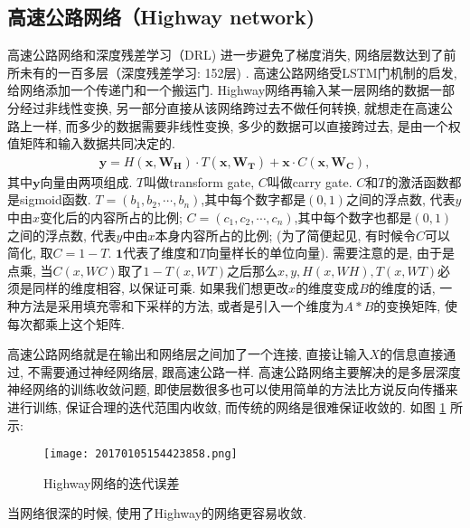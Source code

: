 \subsection{高速公路网络（Highway network) }
高速公路网络和深度残差学习（DRL) 进一步避免了梯度消失, 网络层数达到了前所未有的一百多层（深度残差学习: 152层) \cite{HeCVPR2016-9590, NIPS2015-5850}.
高速公路网络受LSTM门机制的启发, 给网络添加一个传递门和一个搬运门. Highway网络再输入某一层网络的数据一部分经过非线性变换, 另一部分直接从该网络跨过去不做任何转换, 就想走在高速公路上一样, 而多少的数据需要非线性变换, 多少的数据可以直接跨过去, 是由一个权值矩阵和输入数据共同决定的.
\begin{align}
    \mathbf{y}=H\left(\mathbf{x}, \mathbf{W}_{\mathbf{H}}\right) \cdot T\left(\mathbf{x}, \mathbf{W}_{\mathbf{T}}\right)+\mathbf{x} \cdot C\left(\mathbf{x}, \mathbf{W}_{\mathbf{C}}\right),
\end{align}
其中$\bm y$向量由两项组成. $T$叫做transform gate, $C$叫做carry gate. $C$和$T$的激活函数都是sigmoid函数.
$T=(b_1, b_2, \cdots, b_n)$,其中每个数字都是$(0, 1)$之间的浮点数, 代表$y$中由$x$变化后的内容所占的比例;
$C=(c_1, c_2, \cdots, c_n)$,其中每个数字也都是$(0, 1)$之间的浮点数, 代表$y$中由$x$本身内容所占的比例;
(为了简便起见, 有时候令$C$可以简化, 取$C=1-T$. $\bm 1$代表了维度和$T$向量样长的单位向量).
需要注意的是, 由于是点乘, 当$C(x,WC)$取了$1-T(x,WT)$之后那么$x,y,H(x,WH),T(x,WT)$必须是同样的维度相容, 以保证可乘.
如果我们想更改$x$的维度变成$B$的维度的话, 一种方法是采用填充零和下采样的方法, 或者是引入一个维度为$A*B$的变换矩阵, 使每次都乘上这个矩阵.

高速公路网络就是在输出和网络层之间加了一个连接, 直接让输入$X$的信息直接通过, 不需要通过神经网络层, 跟高速公路一样.
高速公路网络主要解决的是多层深度神经网络的训练收敛问题, 即使层数很多也可以使用简单的方法比方说反向传播来进行训练, 保证合理的迭代范围内收敛, 而传统的网络是很难保证收敛的. 如图 \ref{20170105154423858} 所示:
\begin{figure}[H]
    \centering
    \texttt{[image: 20170105154423858.png]}
    \caption{Highway网络的迭代误差}
    \label{20170105154423858}
    \vspace{-0.4cm}
\end{figure}
当网络很深的时候, 使用了Highway的网络更容易收敛.
